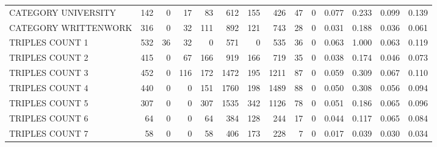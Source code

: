 \begin{tabular}{lrrrrrrrrrllll}
 CATEGORY UNIVERSITY      &             142 &             0 &              17 &              83 &             612 &  155 &  426 &   47 &    0 & 0.077 & 0.233 & 0.099 & 0.139 \\
 CATEGORY WRITTENWORK     &             316 &             0 &              32 &             111 &             892 &  121 &  743 &   28 &    0 & 0.031 & 0.188 & 0.036 & 0.061 \\
 TRIPLES COUNT 1          &             532 &            36 &              32 &               0 &             571 &    0 &  535 &   36 &    0 & 0.063 & 1.000 & 0.063 & 0.119 \\
 TRIPLES COUNT 2          &             415 &             0 &              67 &             166 &             919 &  166 &  719 &   35 &    0 & 0.038 & 0.174 & 0.046 & 0.073 \\
 TRIPLES COUNT 3          &             452 &             0 &             116 &             172 &            1472 &  195 & 1211 &   87 &    0 & 0.059 & 0.309 & 0.067 & 0.110 \\
 TRIPLES COUNT 4          &             440 &             0 &               0 &             151 &            1760 &  198 & 1489 &   88 &    0 & 0.050 & 0.308 & 0.056 & 0.094 \\
 TRIPLES COUNT 5          &             307 &             0 &               0 &             307 &            1535 &  342 & 1126 &   78 &    0 & 0.051 & 0.186 & 0.065 & 0.096 \\
 TRIPLES COUNT 6          &              64 &             0 &               0 &              64 &             384 &  128 &  244 &   17 &    0 & 0.044 & 0.117 & 0.065 & 0.084 \\
 TRIPLES COUNT 7          &              58 &             0 &               0 &              58 &             406 &  173 &  228 &    7 &    0 & 0.017 & 0.039 & 0.030 & 0.034 \\
\hline
\end{tabular}